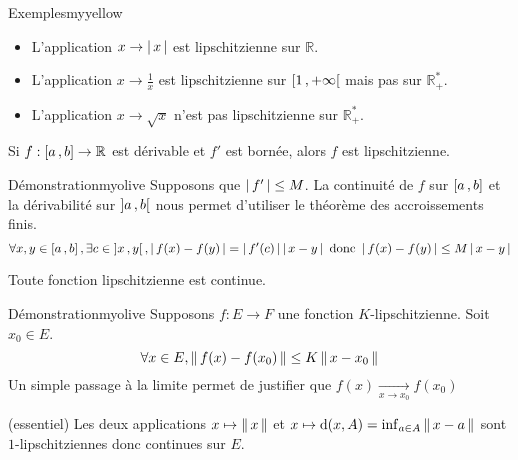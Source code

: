     \begin{omed}{Exemples}{myyellow}
        \begin{itemize}
            \item L’application $x \rightarrow \left\lvert \,x \, \right\rvert$ est lipschitzienne sur $\mathbb{R}$.
            \item L’application $x \rightarrow \frac{1}{x}$ est lipschitzienne sur $\left[ 1 \, , +\infty \right[$ mais pas sur $\mathbb{R}_+^*$.
            \item L’application $x \rightarrow \sqrt{x}$ n’est pas lipschitzienne sur $\mathbb{R}_+^*$.
        \end{itemize}
    \end{omed}

    \begin{prop}{}{}
        Si $f : \left[ a \, , b \right] \rightarrow \mathbb{R}$ est dérivable et $f'$ est bornée, alors $f$ est lipschitzienne.
    \end{prop}

    \begin{demo}{Démonstration}{myolive}
        Supposons que $\left\lvert \,f' \, \right\rvert \leq M$. La continuité de $f$ sur $\left[ a \, , b \right]$ et la dérivabilité sur $\left] a \, , b \right[$  nous permet d’utiliser le théorème des accroissements finis.
        \[ \forall x,y \in \left[ a \, , b \right], \exists c \in \left] x \, , y \right[, \left\lvert \,f(x)-f(y) \, \right\rvert = \left\lvert \,f'(c) \, \right\rvert\left\lvert \,x-y \, \right\rvert \text{ donc } \left\lvert \,f(x) - f(y) \, \right\rvert \leq M \left\lvert \,x-y \, \right\rvert \] 
    \end{demo}

    \begin{prop}{}{}
        Toute fonction lipschitzienne est continue.
    \end{prop}

    \begin{demo}{Démonstration}{myolive}
        Supposons $f : E \rightarrow F$ une fonction $K$-lipschitzienne. Soit $x_0 \in E$.
        \[ \forall x \in E, \left\lVert \,f(x)-f(x_0) \, \right\rVert \leq K \left\lVert \,x - x_0 \, \right\rVert \] 
        Un simple passage à la limite permet de justifier que $f(x) \underset{x \rightarrow x_0}{\longrightarrow} f(x_0)$
    \end{demo}

    \begin{coro}{(essentiel)}{}
        Les deux applications $x \mapsto \left\lVert \,x \, \right\rVert$ et $x \mapsto \operatorname{d}(x,A) = \inf_{a \in A} \left\lVert \,x-a \, \right\rVert$ sont $1$-lipschitziennes donc continues sur $E$.
    \end{coro}

